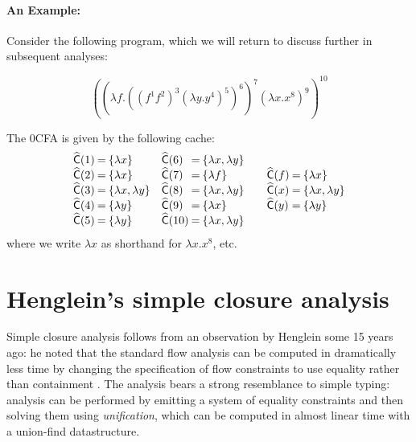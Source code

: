 \documentclass{llncs}
\newcommand\cache{\widehat{\mathsf{C}}}
\begin{document}
\paragraph{An Example:} 

Consider the following program, which we will return to discuss
further in subsequent analyses:

\begin{displaymath}
((\lambda f.((f^1 f^2)^3(\lambda y.y^4)^5)^6)^7 (\lambda
x.x^8)^9)^{10}
\end{displaymath}

The 0CFA is given by the following cache:
\begin{displaymath}
\begin{array}{l@{\:=\:}l@{\hspace{10pt}}l@{\:=\:}l}
\cache(1) & \{ \lambda x \} &
\cache(6) & \{ \lambda x, \lambda y \} \\
\cache(2) & \{ \lambda x \} &
\cache(7) & \{ \lambda f \} \\
\cache(3) & \{ \lambda x, \lambda y \} &
\cache(8) & \{ \lambda x, \lambda y \} \\
\cache(4) & \{ \lambda y \} &
\cache(9) & \{ \lambda x \} \\
\cache(5) & \{ \lambda y \} &
\cache(10)& \{ \lambda x, \lambda y \}
\end{array}
\hspace{10pt}
\begin{array}{l@{\:=\:}l}
\cache(f) & \{ \lambda x \} \\
\cache(x) & \{ \lambda x, \lambda y \}\\
\cache(y) & \{ \lambda y \}
\end{array}
\end{displaymath}
where we write $\lambda x$ as shorthand for $\lambda x.x^8$, etc.


\section{Henglein's simple closure analysis}
\label{sec:simple}

Simple closure analysis follows from an observation by Henglein some
15 years ago: he noted that the standard flow analysis can be computed
in dramatically less time by changing the specification of flow
constraints to use equality rather than containment
\cite{henglein92d}.  The analysis bears a strong resemblance to simple
typing: analysis can be performed by emitting a system of equality
constraints and then solving them using {\em unification}, which can
be computed in almost linear time with a union-find datastructure.
\end{document}
